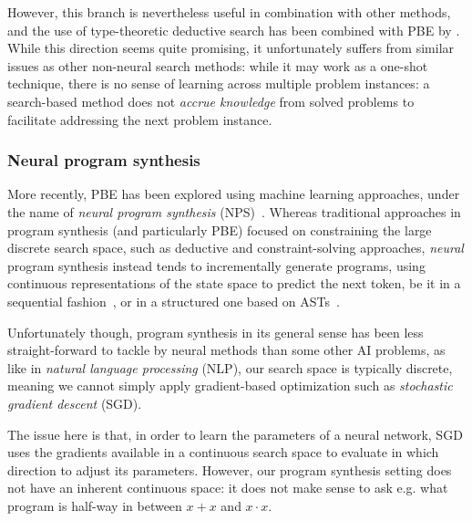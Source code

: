 \documentclass{article}
\begin{document}

However, this branch is nevertheless useful in combination with other methods,
and the use of type-theoretic deductive search has been combined with PBE by \citet{myth}.
While this direction seems quite promising,
it unfortunately suffers from similar issues as other non-neural search methods:
while it may work as a one-shot technique,
there is no sense of learning across multiple problem instances:
a search-based method does not \emph{accrue knowledge} from solved problems to facilitate addressing the next problem instance.

\subsubsection{Neural program synthesis}

More recently, PBE has been explored using machine learning approaches, under the name of \emph{neural program synthesis} (NPS)~\citep{nps}.
Whereas traditional approaches in program synthesis (and particularly PBE) focused on constraining the large discrete search space,
such as deductive and constraint-solving approaches,
\emph{neural} program synthesis instead tends to incrementally generate programs,
using continuous representations of the state space to predict the next token,
be it in a sequential fashion~\citep{npi,neuralmachinetranslation,alphanpi},
or in a structured one based on ASTs~\citep{nsps}.

Unfortunately though, program synthesis in its general sense has been less straight-forward to tackle by neural methods than some other AI problems,
as like in \emph{natural language processing} (NLP),
our search space is typically discrete, meaning we cannot simply apply gradient-based optimization such as \emph{stochastic gradient descent} (SGD).~\citep{nps}

The issue here is that, in order to learn the parameters of a neural network, SGD uses the gradients available in a continuous search space to evaluate in which direction to adjust its parameters.
However, our program synthesis setting does not have an inherent continuous space:
it does not make sense to ask e.g. what program is half-way in between $x+x$ and $x \cdot x$.
\end{document}
